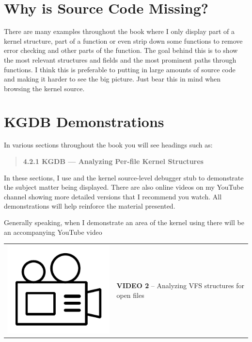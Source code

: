 
\section{Why is Source Code Missing?}

There are many examples throughout the book where I only display part of a kernel structure, part of a function or even strip down some functions to remove error checking and other parts of the function. The goal behind this is to show the most relevant structures and fields and the most prominent paths through functions. I think this is preferable to putting in large amounts of source code and making it harder to see the big picture. Just bear this in mind when browsing the kernel source.


\section{KGDB Demonstrations}

In various sections throughout the book you will see headings such as:

\begin{quote}
\textbf{4.2.1 KGDB --- Analyzing Per-file Kernel Structures}
\end{quote}

\noindent
In these sections, I use  and the kernel source-level debugger stub  to demonstrate the subject matter being displayed. There are also online videos on my YouTube channel showing more detailed versions that I recommend you watch. All  demonstrations will help reinforce the material presented.

Generally speaking, when I demonstrate an area of the kernel using  there will be an accompanying YouTube video

\begin{table}[h]
\begin{tabular}{ll}
\parbox[l]{0.6in}{\includegraphics[scale=0.3]{figures/video-camera.pdf}} & \parbox[l]{4in}{\small{\textbf{VIDEO 2} -- Analyzing VFS structures for open files}}
\end{tabular}
\end{table}

